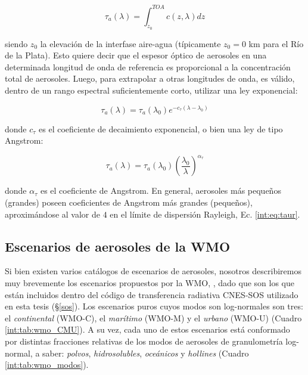     \begin{equation}
        \tau_{a}(\lambda) = \int_{z_{0}}^{TOA}c(z,\lambda) dz
        \label{int:eq:tau_aer_def}
    \end{equation}

    \noindent siendo $z_{0}$ la elevación de la interfase aire-agua (típicamente $z_{0}=0$ km para el Río de la Plata). Esto quiere decir que el espesor óptico de aerosoles en una determinada longitud de onda de referencia es proporcional a la concentración total de aerosoles. Luego, para extrapolar a otras longitudes de onda, es válido, dentro de un rango espectral suficientemente corto, utilizar una ley exponencial:
    
    \begin{equation}
        \tau_{a}(\lambda) = \tau_{a}(\lambda_{0})e^{-c_{\tau}(\lambda-\lambda_{0})}
        \label{int:eq:tau_aer_ang}
    \end{equation}

    \noindent donde $c_{\tau}$ es el coeficiente de decaimiento exponencial, o bien una ley de tipo Angstrom:
    
    \begin{equation}
        \tau_{a}(\lambda) = \tau_{a}(\lambda_{0})\left(\frac{\lambda_{0}}{\lambda}\right)^{\alpha_{\tau}}
        \label{int:eq:tau_aer_exp}
    \end{equation}

    \noindent donde $\alpha_{\tau}$ es el coeficiente de Angstrom. En general, aerosoles más pequeños (grandes) poseen coeficientes de Angstrom más grandes (pequeños), aproximándose al valor de $4$ en el límite de dispersión Rayleigh, Ec. \ref{int:eq:taur}.
    
    \subsection{Escenarios de aerosoles de la WMO}
    \label{int:s:wmo}
        Si bien existen varios catálogos de escenarios de aerosoles, nosotros describiremos muy brevemente los escenarios propuestos por la WMO, \cite{wmo1986}, dado que son los que están incluidos dentro del código de transferencia radiativa CNES-SOS utilizado en esta tesis (\S \ref{sos}). Los escenarios puros cuyos modos son log-normales son tres: el \textit{continental} (WMO-C), el \textit{marítimo} (WMO-M) y el \textit{urbano} (WMO-U) (Cuadro \ref{int:tab:wmo_CMU}). A su vez, cada uno de estos escenarios está conformado por distintas fracciones relativas de los modos de aerosoles de granulometría log-normal, a saber: \textit{polvos}, \textit{hidrosolubles}, \textit{oceánicos} y \textit{hollines} (Cuadro \ref{int:tab:wmo_modos}). 
        
